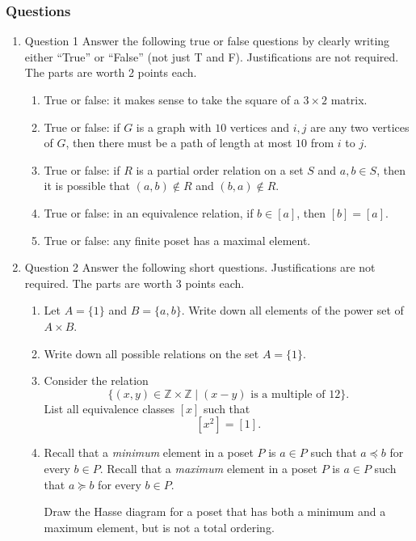 \documentclass{amsart}
\begin{document}
\subsubsection{Questions}
\label{sec:org1eb1292}
\begin{enumerate}
\item Question 1
\label{sec:org376b5c8}
Answer the following true or false questions by clearly writing either ``True'' or ``False'' (not just T and F). Justifications are not required. The parts are worth 2 points each.
\begin{enumerate}
\item True or false: it makes sense to take the square of a \(3 \times 2\) matrix.
\item True or false: if \(G\) is a graph with \(10\) vertices and \(i,j\) are any two vertices of \(G\), then there must be a path of length at most \(10\) from \(i\) to \(j\).
\item True or false: if \(R\) is a partial order relation on a set \(S\) and \(a,b \in S\), then it is possible that \((a,b) \notin R\) and \((b,a) \notin R\).
\item True or false: in an equivalence relation, if \(b \in [a]\), then \([b] = [a]\).
\item True or false: any finite poset has a maximal element.
\end{enumerate}
\item Question 2
\label{sec:org0b64259}
Answer the following short questions. Justifications are not required. The parts are worth 3 points each.
\begin{enumerate}
\item Let \(A = \{1\}\) and \(B = \{a,b\}\).
Write down all elements of the power set of \(A \times B\).

\item Write down all possible relations on the set \(A = \{1\}\).

\item Consider the relation
\[\{(x,y) \in \mathbb{Z} \times \mathbb{Z} \mid (x - y)\text{ is a multiple of }12\}.\]
List all equivalence classes \([x]\) such that 
\[[x^2] = [1].\]

\item Recall that a \emph{minimum} element in a poset \(P\) is \(a \in P\) such that \(a \preceq b\) for every \(b \in P\).
Recall that a \emph{maximum} element in a poset \(P\) is \(a \in P\) such that \(a \succeq b\) for every \(b \in P\).

Draw the Hasse diagram for a poset that has both a minimum and a maximum element, but is not a total ordering.


\end{enumerate}
\end{enumerate}
\end{document}
